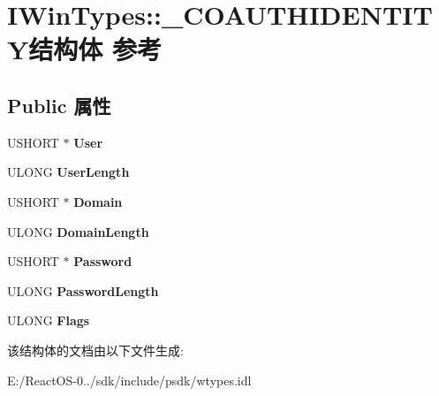 \hypertarget{struct_i_win_types_1_1___c_o_a_u_t_h_i_d_e_n_t_i_t_y}{}\section{I\+Win\+Types\+:\+:\+\_\+\+C\+O\+A\+U\+T\+H\+I\+D\+E\+N\+T\+I\+T\+Y结构体 参考}
\label{struct_i_win_types_1_1___c_o_a_u_t_h_i_d_e_n_t_i_t_y}
\subsection*{Public 属性}
\begin{DoxyCompactItemize}
\item 
\mbox{\label{struct_i_win_types_1_1___c_o_a_u_t_h_i_d_e_n_t_i_t_y_a9dc0b2d07e05b00efe65121f04d2be66}} 
U\+S\+H\+O\+RT $\ast$ {\bfseries User}
\item 
\mbox{\label{struct_i_win_types_1_1___c_o_a_u_t_h_i_d_e_n_t_i_t_y_a6373e028150b651a6129e5c39b2e60f7}} 
U\+L\+O\+NG {\bfseries User\+Length}
\item 
\mbox{\label{struct_i_win_types_1_1___c_o_a_u_t_h_i_d_e_n_t_i_t_y_a157ac35cded5e04617ea14d8f7875896}} 
U\+S\+H\+O\+RT $\ast$ {\bfseries Domain}
\item 
\mbox{\label{struct_i_win_types_1_1___c_o_a_u_t_h_i_d_e_n_t_i_t_y_ad701116cb74e38dc4313a570366d573a}} 
U\+L\+O\+NG {\bfseries Domain\+Length}
\item 
\mbox{\label{struct_i_win_types_1_1___c_o_a_u_t_h_i_d_e_n_t_i_t_y_a76cd1f9c04bd26d35fe7edae047b3eb4}} 
U\+S\+H\+O\+RT $\ast$ {\bfseries Password}
\item 
\mbox{\label{struct_i_win_types_1_1___c_o_a_u_t_h_i_d_e_n_t_i_t_y_a589eeee557410525cdaffa0738212a07}} 
U\+L\+O\+NG {\bfseries Password\+Length}
\item 
\mbox{\label{struct_i_win_types_1_1___c_o_a_u_t_h_i_d_e_n_t_i_t_y_a26dc6043ca96c4ddec8207c8341a9044}} 
U\+L\+O\+NG {\bfseries Flags}
\end{DoxyCompactItemize}


该结构体的文档由以下文件生成\+:\begin{DoxyCompactItemize}
\item 
E\+:/\+React\+O\+S-\/0../sdk/include/psdk/wtypes.\+idl\end{DoxyCompactItemize}
